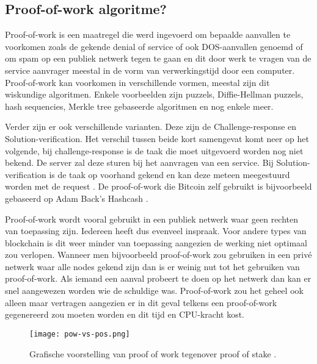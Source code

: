 \subsection{Proof-of-work algoritme?}
Proof-of-work is een maatregel die werd ingevoerd om bepaalde aanvallen te voorkomen zoals de gekende denial of service of ook DOS-aanvallen genoemd of om spam op een publiek netwerk tegen te gaan en dit door werk te vragen van de service aanvrager meestal in de vorm van verwerkingstijd door een computer. Proof-of-work kan voorkomen in verschillende vormen, meestal zijn dit wiskundige algoritmen. Enkele voorbeelden zijn puzzels, Diffie-Hellman puzzels, hash sequencies, Merkle tree gebaseerde algoritmen en nog enkele meer. 

Verder zijn er ook verschillende varianten. Deze zijn de Challenge-response en Solution-verification. Het verschil tussen beide kort samengevat komt neer op het volgende, bij challenge-response is de taak die moet uitgevoerd worden nog niet bekend. De server zal deze sturen bij het aanvragen van een service. Bij Solution-verification is de taak op voorhand gekend en kan deze meteen meegestuurd worden met de request \textcite{Mazieres}. De proof-of-work die Bitcoin zelf gebruikt is bijvoorbeeld gebaseerd op Adam Back's Hashcash \textcite{Nakamoto2008}.

Proof-of-work wordt vooral gebruikt in een publiek netwerk waar geen rechten van toepassing zijn. Iedereen heeft dus evenveel inspraak. Voor andere types van blockchain is dit weer minder van toepassing aangezien de werking niet optimaal zou verlopen. Wanneer men bijvoorbeeld proof-of-work zou gebruiken in een privé netwerk waar alle nodes gekend zijn dan is er weinig nut tot het gebruiken van proof-of-work. Als iemand een aanval probeert te doen op het netwerk dan kan er snel aangewezen worden wie de schuldige was. Proof-of-work zou het geheel ook alleen maar vertragen aangezien er in dit geval telkens een proof-of-work gegenereerd zou moeten worden en dit tijd en CPU-kracht kost. 

\begin{figure}
	\texttt{[image: pow-vs-pos.png]}
	\caption{Grafische voorstelling van proof of work tegenover proof of stake \textcite{blockgeeks}.}
	\label{fig:pow-vs-pos}
\end{figure}

